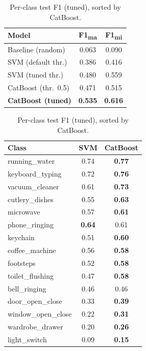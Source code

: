 \documentclass{article}
\begin{document}
\begin{table}
  \begin{minipage}{0.46\linewidth}
    \centering
    \caption{Test performance (tuned thresholds unless noted); identical split,
    features and baseline.}
    \label{tab:final}
    \begin{tabular}{lcc}
      \toprule
      Model & F1\textsubscript{ma} & F1\textsubscript{mi} \\
      \midrule
      Baseline (random)        & 0.063 & 0.090 \\
      SVM (default thr.)       & 0.386 & 0.416 \\
      SVM (tuned thr.)         & 0.480 & 0.559 \\
      CatBoost (thr.\ 0.5)     & 0.471 & 0.515 \\
      \textbf{CatBoost (tuned)}& \textbf{0.535} & \textbf{0.616} \\
      \bottomrule
    \end{tabular}
  \end{minipage}\hfill
  \begin{minipage}{0.5\linewidth}
    \centering
    \caption{Per-class test F1 (tuned), sorted by CatBoost.}
    \label{tab:perclass}
    \small
    \begin{tabular}{lcc}
      \toprule
      Class & SVM & CatBoost \\
      \midrule
      running\_water    & 0.74 & \textbf{0.77} \\
      keyboard\_typing  & 0.72 & \textbf{0.76} \\
      vacuum\_cleaner   & 0.61 & \textbf{0.73} \\
      cutlery\_dishes   & 0.55 & \textbf{0.63} \\
      microwave         & 0.57 & \textbf{0.61} \\
      phone\_ringing    & \textbf{0.64} & 0.61 \\
      keychain          & 0.51 & \textbf{0.60} \\
      coffee\_machine   & 0.56 & \textbf{0.58} \\
      footsteps         & 0.52 & \textbf{0.58} \\
      toilet\_flushing  & 0.47 & \textbf{0.58} \\
      bell\_ringing     & 0.46 & 0.46 \\
      door\_open\_close & 0.33 & \textbf{0.39} \\
      window\_open\_close & 0.22 & \textbf{0.31} \\
      wardrobe\_drawer  & 0.20 & \textbf{0.26} \\
      light\_switch     & 0.09 & \textbf{0.15} \\
      \bottomrule
    \end{tabular}
  \end{minipage}
\end{table}
\end{document}
